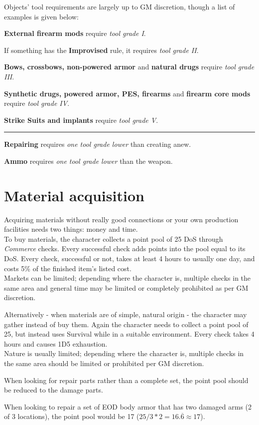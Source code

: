 \documentclass[12pt,a4paper,openany,usenames,dvipsnames]{book}
\begin{document}
	Objects’ tool requirements are largely up to GM discretion, though a list of examples is given below:
	\begin{sitemize}[8]
		\item \textbf{External firearm mods} require \emph{tool grade I}.
		\item If something has the \textbf{Improvised} rule, it requires \emph{tool grade II}.
		\item \textbf{Bows, crossbows, non-powered armor} and \textbf{natural drugs} require \emph{tool grade III}.
		\item \textbf{Synthetic drugs, powered armor, PES, firearms} and \textbf{firearm core mods} require \emph{tool grade IV}.
		\item \textbf{Strike Suits and implants} require \emph{tool grade V}.
		\hrule
		\item \textbf{Repairing} requires \emph{one tool grade lower} than creating anew.
		\item \textbf{Ammo} requires \emph{one tool grade lower} than the weapon.
	\end{sitemize}

	\chapter{Material acquisition}
	Acquiring materials without really good connections or your own production facilities needs two things: money and time.\\
	To buy materials, the character collects a point pool of 25 DoS through \emph{Commerce} checks.
	Every successful check adds points into the pool equal to its DoS.
	Every check, successful or not,
		takes at least 4 hours to usually one day,
		and costs 5\% of the finished item’s listed cost.\\
	Markets can be limited; depending where the character is, multiple checks in the same area and general time may be limited or completely prohibited as per GM discretion. \par
	Alternatively - when materials are of simple, natural origin - the character may gather instead of buy them.
	Again the character needs to collect a point pool of 25,
		but instead uses Survival while in a suitable environment.
	Every check takes 4 hours and causes 1D5 exhaustion.\\
	Nature is usually limited; depending where the character is, multiple checks in the same area should be limited or prohibited per GM discretion.
	\par
	When looking for repair parts rather than a complete set,
	the point pool should be reduced to the damage parts.
	\begin{exampleblock}
		When looking to repair a set of EOD body armor
		that has two damaged arms (2 of 3 locations),
		the point pool would be 17 ($25 / 3 * 2 = 16.\overline{6} \approx 17$).
	\end{exampleblock}
\end{document}
